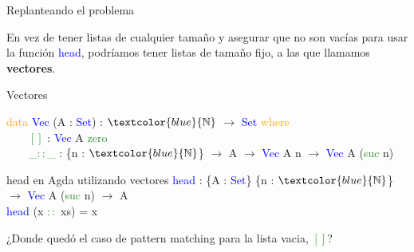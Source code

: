 \documentclass[xcolor=dvipsnames]{beamer} %
\newcommand{\cf}[1]{\textcolor{blue}{#1}}
\newcommand{\ct}[1]{\textcolor{blue}{#1}}
\newcommand{\cc}[1]{\textcolor{ForestGreen}{#1}}
\newcommand{\ck}[1]{\textcolor{orange}{#1}}
\newcommand{\N}{\ct{\mathbb{N}}}
\newcommand{\ra}{\rightarrow}
\newcommand{\T}{ \ \ \ \ }
\begin{document}
\begin{frame}

\begin{block}{Replanteando el problema}

En vez de tener listas de cualquier tamaño y asegurar
que no son vacías para usar la función \cf{head}, podríamos
tener listas de tamaño fijo, a las que llamamos \textbf{vectores}.
\end{block}

\pause

\begin{block}{Vectores}

\ck{data} \ct{Vec} (A : \ct{Set}) : $\N$ $\ra$ \ct{Set} \ck{where}\\
\pause
\T \cc{$[]$}     : \ct{Vec} A \cc{zero}\\
\pause
\T \cc{\_$::$\_} : \{n : $\N$\} $\ra$ A $\ra$ \ct{Vec} A n $\ra$ \ct{Vec} A (\cc{suc} n)

\end{block}

\pause

\begin{block}{head en Agda utilizando vectores}
    \cf{head} : \{A : \ct{Set}\} \{n : $\N$\} $\ra$ \ct{Vec} A (\cc{suc} n) $\ra$ A \\
    \pause
    \cf{head} (x \cc{$::$} xs) = x
\end{block}


\pause

\begin{block}{}
¿Donde quedó el caso de pattern matching para la lista vacia, \cc{$[]$}?
\end{block}


\end{frame}
\end{document}
